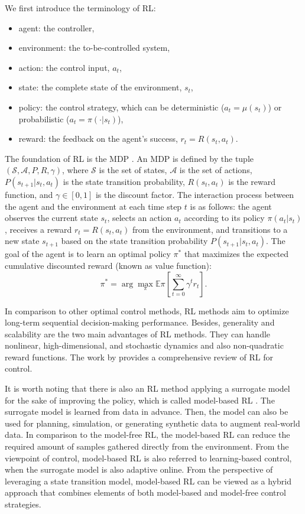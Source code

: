 We first introduce the terminology of \ac{RL}:
\begin{itemize}
\item agent: the controller,
\item environment: the to-be-controlled system,
\item action: the control input, $a_t$,
\item state: the complete state of the environment, $s_t$,
\item policy: the control strategy, which can be deterministic ($a_t=\mu(s_t)$) or probabilistic ($a_t=\pi(\cdot|s_t)$),
\item reward: the feedback on the agent's success, $r_t=R(s_t,a_t)$.
\end{itemize}
The foundation of \ac{RL} is the \ac{MDP} \citep{mdp2014}. An \ac{MDP} is defined by the tuple $(\mathcal{S}, \mathcal{A}, P, R, \gamma)$, where $\mathcal{S}$ is the set of states, $\mathcal{A}$ is the set of actions, $P(s_{t+1}|s_t,a_t)$ is the state transition probability, $R(s_t,a_t)$ is the reward function, and $\gamma\in[0,1]$ is the discount factor. The interaction process between the agent and the environment at each time step $t$ is as follows: the agent observes the current state $s_t$, selects an action $a_t$ according to its policy $\pi(a_t|s_t)$, receives a reward $r_t=R(s_t,a_t)$ from the environment, and transitions to a new state $s_{t+1}$ based on the state transition probability $P(s_{t+1}|s_t,a_t)$. The goal of the agent is to learn an optimal policy $\pi^*$ that maximizes the expected cumulative discounted reward (known as value function):
\begin{equation}
    \pi^* = \arg\max_{\pi} \mathbb{E}{\pi}\left[\sum_{t=0}^{\infty} \gamma^t r_t\right].
\end{equation}          

In comparison to other optimal control methods, \ac{RL} methods aim to optimize long-term sequential decision-making performance. Besides, generality and scalability are the two main advantages of \ac{RL} methods. They can handle nonlinear, high-dimensional, and stochastic dynamics and also non-quadratic reward functions. The work by \citeauthor{rlforcontrol2018} \citeyearpar{rlforcontrol2018} provides a comprehensive review of \ac{RL} for control. 

It is worth noting that there is also an \ac{RL} method applying a surrogate model for the sake of improving the policy, which is called model-based \ac{RL} \citep{sutton1990, mbrl2020}. The surrogate model is learned from data in advance. Then, the model can also be used for planning, simulation, or generating synthetic data to augment real-world data. In comparison to the model-free \ac{RL}, the model-based \ac{RL} can reduce the required amount of samples gathered directly from the environment. From the viewpoint of control, model-based \ac{RL} is also referred to learning-based control, when the surrogate model is also adaptive online. From the perspective of leveraging a state transition model, model-based \ac{RL} can be viewed as a hybrid approach that combines elements of both model-based and model-free control strategies.

